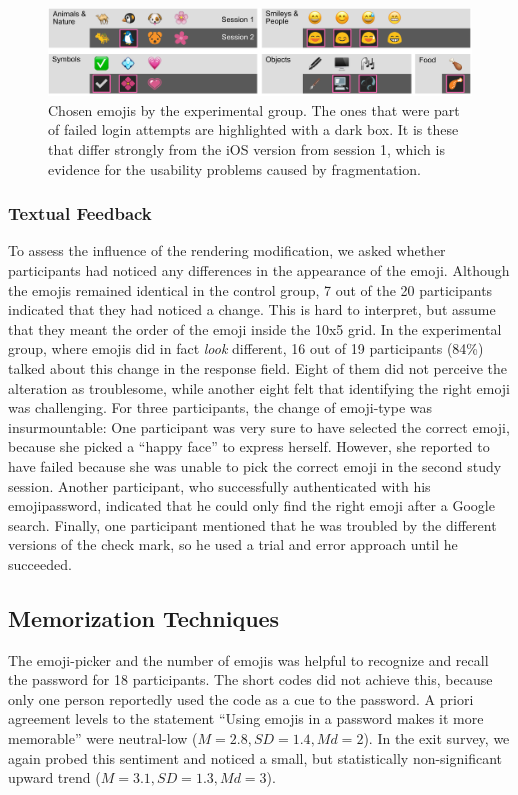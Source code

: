 \begin{figure}
	\centering
	\includegraphics[width=\linewidth]{figures/emojipasswords/experimental-group-errors}
	\caption{
		\label{fig:emojipasswords:experimental-group-failures}
		Chosen emojis by the experimental group. The ones that were part of failed login attempts are highlighted with a dark box. It is these that differ strongly from the iOS version from session 1, which is evidence for the usability problems caused by fragmentation.
	}
\end{figure}


\subsubsection{Textual Feedback}
To assess the influence of the rendering modification, we asked whether participants had noticed any differences in the appearance of the emoji. Although the emojis remained identical in the control group, 7 out of the 20 participants indicated that they had noticed a change. This is hard to interpret, but assume that they meant the order of the emoji inside the 10x5 grid. In the experimental group, where emojis did in fact \textit{look} different, 16 out of 19 participants (84\%) talked about this change in the response field. Eight of them did not perceive the alteration as troublesome, while another eight felt that identifying the right emoji was challenging. For three participants, the change of emoji-type was insurmountable: One participant was very sure to have selected the correct emoji, because she picked a ``happy face'' to express herself. However, she reported to have failed because she was unable to pick the correct emoji in the second study session. Another participant, who successfully authenticated with his emojipassword, indicated that he could only find the right emoji after a Google search. Finally, one participant mentioned that he was troubled by the different versions of the check mark, so he used a trial and error approach until he succeeded.

\subsection{Memorization Techniques}
The emoji-picker and the number of emojis was helpful to recognize and recall the password for 18 participants. The short codes did not achieve this, because only one person reportedly used the code as a cue to the password. A priori agreement levels to the statement ``Using emojis in a password makes it more memorable'' were neutral-low ($M=2.8, SD=1.4, Md=2$). In the exit survey, we again probed this sentiment and noticed a small, but statistically non-significant upward trend ($M=3.1, SD=1.3, Md=3$). 

